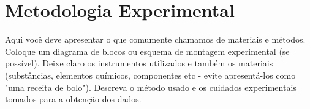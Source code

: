 
\newpage

\section{Metodologia Experimental}
Aqui você deve apresentar o que comumente chamamos de materiais e métodos. Coloque um diagrama de blocos ou esquema de montagem experimental (se possível). Deixe claro os instrumentos utilizados e também os materiais (substâncias, elementos químicos, componentes etc - evite apresentá-los como "uma receita de bolo"). Descreva o método usado e os cuidados experimentais tomados para a obtenção dos dados.